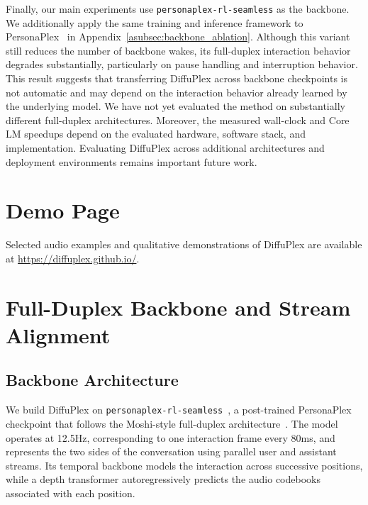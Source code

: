 Finally, our main experiments use \texttt{personaplex-rl-seamless} as the backbone.
We additionally apply the same training and inference framework to PersonaPlex~\citep{11463413} in Appendix~\ref{asubsec:backbone_ablation}.
Although this variant still reduces the number of backbone wakes, its full-duplex interaction behavior degrades substantially, particularly on pause handling and interruption behavior.
This result suggests that transferring DiffuPlex across backbone checkpoints is not automatic and may depend on the interaction behavior already learned by the underlying model.
We have not yet evaluated the method on substantially different full-duplex architectures.
Moreover, the measured wall-clock and Core LM speedups depend on the evaluated hardware, software stack, and implementation.
Evaluating DiffuPlex across additional architectures and deployment environments remains important future work.

\section{Demo Page}
\label{asec:demo}
Selected audio examples and qualitative demonstrations of DiffuPlex are available at \url{https://diffuplex.github.io/}.

\section{Full-Duplex Backbone and Stream Alignment}
\label{asec:backbone}

\subsection{Backbone Architecture}
\label{asubsec:backbone_architecture}

We build DiffuPlex on \texttt{personaplex-rl-seamless}~\citep{ohashi2026multifacetedinteractivityalignmentfullduplex}, a post-trained PersonaPlex checkpoint that follows the Moshi-style full-duplex architecture~\citep{defossez2024moshispeechtextfoundationmodel}.
The model operates at 12.5Hz, corresponding to one interaction frame every 80ms, and represents the two sides of the conversation using parallel user and assistant streams.
Its temporal backbone models the interaction across successive positions, while a depth transformer autoregressively predicts the audio codebooks associated with each position.


